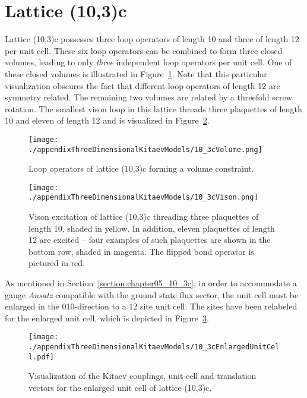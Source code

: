 \section{Lattice (10,3)c}
\label{appendix:ThreeDimensionalKitaevModels_10_3c}
%
%
Lattice (10,3)c possesses three loop operators of length 10 and three of length 12 per unit cell.
These six loop operators can be combined to form three closed volumes, leading to only \textit{three} independent loop operators per unit cell.
One of these closed volumes is illustrated in Figure~\ref{fig:appendix_10_3cVolume}.
Note that this particular visualization obscures the fact that different loop operators of length 12 are symmetry related.
The remaining two volumes are related by a threefold screw rotation.
The smallest vison loop in this lattice threads three plaquettes of length 10 and eleven of length 12 and is visualized in Figure~\ref{fig:appendix_10_3cVison}.
%
\begin{figure}[ht!]
	\centering
	\texttt{[image: ./appendixThreeDimensionalKitaevModels/10\_3cVolume.png]}
	\caption{
		Loop operators of lattice (10,3)c forming a volume constraint.
	}
	\label{fig:appendix_10_3cVolume}
\end{figure}
%
%
\begin{figure}[ht!]
	\centering
	\texttt{[image: ./appendixThreeDimensionalKitaevModels/10\_3cVison.png]}
	\caption{
		Vison excitation of lattice (10,3)c threading three plaquettes of length 10, shaded in yellow.
		In addition, eleven plaquettes of length 12 are excited -- four examples of such plaquettes are shown in the bottom row, shaded in magenta.
		The flipped bond operator is pictured in red.
	}
	\label{fig:appendix_10_3cVison}
\end{figure}
%

As mentioned in Section~\ref{section:chapter05_10_3c}, in order to accommodate a gauge \textit{Ansatz} compatible with the ground state flux sector, the unit cell must be enlarged in the 010-direction to a 12 site unit cell.
The sites have been relabeled for the enlarged unit cell, which is depicted in Figure~\ref{fig:appendix_10_3cEnlargedUnitCell}.
%
\begin{figure}[tb]
	\centering
	\texttt{[image: ./appendixThreeDimensionalKitaevModels/10\_3cEnlargedUnitCell.pdf]}
	\caption{
		Visualization of the Kitaev couplings, unit cell and translation vectors for the enlarged unit cell of lattice (10,3)c.
	}
	\label{fig:appendix_10_3cEnlargedUnitCell}
\end{figure}
%
